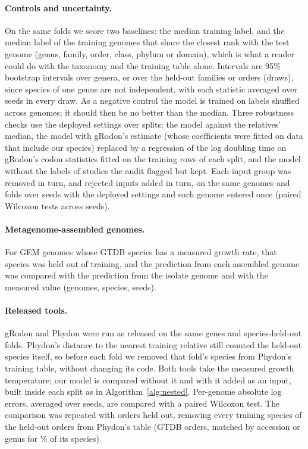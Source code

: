 \paragraph{Controls and uncertainty.} On the same folds we score two baselines: the median training label, and the median
label of the training genomes that share the closest rank with the test genome (genus, family, order, class, phylum or domain),
which is what a reader could do with the taxonomy and the training table alone. Intervals are 95\% bootstrap intervals over
genera, or over the held-out families or orders (\NBootDraws draws), since species of one genus are not independent, with each statistic averaged over seeds in every draw. As a negative control the model is
trained on labels shuffled across genomes; it should then be no better than the median. Three robustness checks use the deployed settings over \TenNSeeds splits: the model against the relatives' median, the model with
gRodon's estimate (whose coefficients were fitted on data that include our species) replaced by a regression of the log
doubling time on gRodon's codon statistics fitted on the training rows of each split, and the model without the labels of
studies the audit flagged but kept. Each input group was removed in
turn, and rejected inputs added in turn, on the same genomes and folds over \NSeedsAblation seeds with the deployed settings
and each genome entered once (paired Wilcoxon tests across seeds).

\paragraph{Metagenome-assembled genomes.} For GEM genomes whose GTDB species has a measured growth rate, that species was
held out of training, and the prediction from each assembled genome was compared with the prediction from the isolate
genome and with the measured value (\MagNGenomes genomes, \MagNSpecies species, \NSeedsMag seeds).

\paragraph{Released tools.} gRodon \citep{weissman2021} and Phydon \citep{xu2025} were run as released on the same genes
and species-held-out folds. Phydon's distance to the nearest training relative still counted the held-out species itself,
so before each fold we removed that fold's species from Phydon's training table, without changing its code. Both tools take
the measured growth temperature; our model is compared without it and with it added as an input, built inside each split
as in Algorithm~\ref{alg:nested}. Per-genome absolute log errors, averaged over seeds, are compared with a paired Wilcoxon
test. The comparison was repeated with orders held out, removing every training species of the held-out orders from Phydon's
table (GTDB orders, matched by accession or genus for \PhydonOrderMapped\% of its species).

